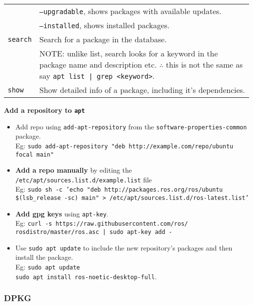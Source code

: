 \begin{tabularx}{\linewidth}{lX}
                                & \texttt{--upgradable}, shows packages with available updates.\\
                                & \texttt{--installed}, shows installed packages.\\
    \texttt{search}             & Search for a package in the database.\\
                                & NOTE: unlike list, search looks for a keyword in the package name and description etc. $\therefore$ this is not the same as say \texttt{apt list | grep <keyword>}.\\
    \texttt{show}               & Show detailed info of a package, including it's dependencies.\\
    \hline
\end{tabularx}

\vfill\null
\columnbreak

\textbf{Add a repository to \texttt{apt}}

\begin{itemize}
    \item Add repo using \texttt{add-apt-repository} from the \texttt{software-properties-common} package.\\
            Eg: \texttt{sudo add-apt-repository "deb http://example.com/repo/ubuntu focal main"}
    \item \textbf{Add a repo manually} by editing the \texttt{/etc/apt/sources.list.d/example.list} file\\
            Eg: \texttt{sudo sh -c 'echo "deb http://packages.ros.org/ros/ubuntu \$(lsb\_release -sc) main" > /etc/apt/sources.list.d/ros-latest.list'}\\
    \item \textbf{Add gpg keys} using \texttt{apt-key}.\\
            Eg: \texttt{curl -s https://raw.githubusercontent.com/ros/}
            \texttt{rosdistro/master/ros.asc | sudo apt-key add -}
    \item Use \texttt{sudo apt update} to include the new repository's packages and then install the package.\\
            Eg: \texttt{sudo apt update}\\
                \texttt{sudo apt install ros-noetic-desktop-full}.
\end{itemize}


\subsubsection{DPKG}

